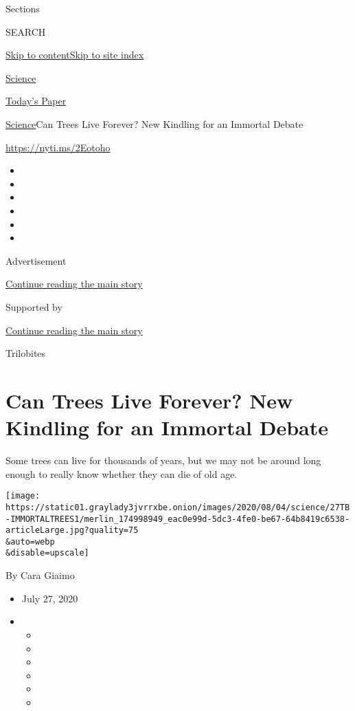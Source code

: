 Sections

SEARCH

\protect\hyperlink{site-content}{Skip to
content}\protect\hyperlink{site-index}{Skip to site index}

\href{https://www.nytimes3xbfgragh.onion/section/science}{Science}

\href{https://myaccount.nytimes3xbfgragh.onion/auth/login?response_type=cookie\&client_id=vi}{}

\href{https://www.nytimes3xbfgragh.onion/section/todayspaper}{Today's
Paper}

\href{/section/science}{Science}\textbar{}Can Trees Live Forever? New
Kindling for an Immortal Debate

\url{https://nyti.ms/2Eotoho}

\begin{itemize}
\item
\item
\item
\item
\item
\item
\end{itemize}

Advertisement

\protect\hyperlink{after-top}{Continue reading the main story}

Supported by

\protect\hyperlink{after-sponsor}{Continue reading the main story}

Trilobites

\hypertarget{can-trees-live-forever-new-kindling-for-an-immortal-debate}{%
\section{Can Trees Live Forever? New Kindling for an Immortal
Debate}\label{can-trees-live-forever-new-kindling-for-an-immortal-debate}}

Some trees can live for thousands of years, but we may not be around
long enough to really know whether they can die of old age.

\texttt{[image: https://static01.graylady3jvrrxbe.onion/images/2020/08/04/science/27TB-IMMORTALTREES1/merlin\_174998949\_eac0e99d-5dc3-4fe0-be67-64b8419c6538-articleLarge.jpg?quality=75\\\&auto=webp\\\&disable=upscale]}

By Cara Giaimo

\begin{itemize}
\item
  July 27, 2020
\item
  \begin{itemize}
  \item
  \item
  \item
  \item
  \item
  \item
  \end{itemize}
\end{itemize}

